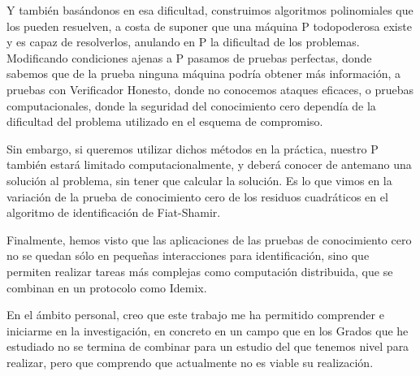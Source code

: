 Y también basándonos en esa dificultad, construimos algoritmos polinomiales que los pueden resuelven, a costa de suponer que una máquina P todopoderosa existe y es capaz de resolverlos, anulando en P la dificultad de los problemas. Modificando condiciones ajenas a P pasamos de pruebas perfectas, donde sabemos que de la prueba ninguna máquina podría obtener más información, a pruebas con Verificador Honesto, donde no conocemos ataques eficaces, o pruebas computacionales, donde la seguridad del conocimiento cero dependía de la dificultad del problema utilizado en el esquema de compromiso.

Sin embargo, si queremos utilizar dichos métodos en la práctica, nuestro P también estará limitado computacionalmente, y deberá conocer de antemano una solución al problema, sin tener que calcular la solución. Es lo que vimos en la variación de la prueba de conocimiento cero de los residuos cuadráticos en el algoritmo de identificación de Fiat-Shamir.

Finalmente, hemos visto que las aplicaciones de las pruebas de conocimiento cero no se quedan sólo en pequeñas interacciones para identificación, sino que permiten realizar tareas más complejas como computación distribuida, que se combinan en un protocolo como Idemix.


En el ámbito personal, creo que este trabajo me ha permitido comprender e iniciarme en la investigación, en concreto en un campo que en los Grados que he estudiado no se termina de combinar para un estudio del que tenemos nivel para realizar, pero que comprendo que actualmente no es viable su realización.


